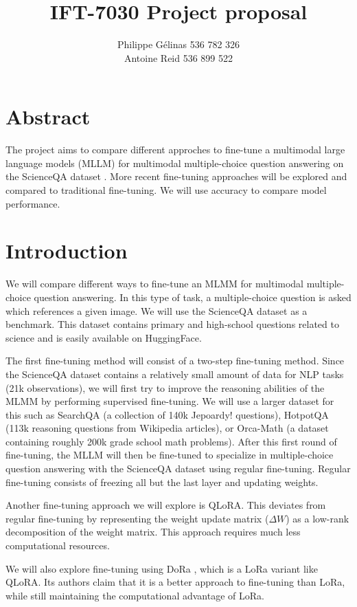 \documentclass[11pt]{article} %
\title{IFT-7030 Project proposal}
\author{Philippe Gélinas 536 782 326 \\ Antoine Reid 536 899 522}
\date{\vspace{-5ex}} %
\begin{document}
\maketitle

\section*{Abstract}
The project aims to compare different approches to fine-tune a multimodal large language models (MLLM) for multimodal multiple-choice question answering on the ScienceQA dataset \cite{ScienceQA}. More recent fine-tuning approaches will be explored and compared to traditional fine-tuning. We will use accuracy to compare model performance.

\section*{Introduction}
We will compare different ways to fine-tune an MLMM for multimodal multiple-choice question answering. In this type of task, a multiple-choice question is asked which references a given image. We will use the ScienceQA dataset as a benchmark. This dataset contains primary and high-school questions related to science and is easily available on HuggingFace.

The first fine-tuning method will consist of a two-step fine-tuning method. Since the ScienceQA dataset contains a relatively small amount of data for NLP tasks (21k observations), we will first try to improve the reasoning abilities of the MLMM by performing supervised fine-tuning. We will use a larger dataset for this such as SearchQA (a collection of 140k Jepoardy! questions), HotpotQA (113k reasoning questions from Wikipedia articles), or Orca-Math (a dataset containing roughly 200k grade school math problems). After this first round of fine-tuning, the MLLM will then be fine-tuned to specialize in multiple-choice question answering with the ScienceQA dataset using regular fine-tuning. Regular fine-tuning consists of freezing all but the last layer and updating weights.

Another fine-tuning approach we will explore is QLoRA. This deviates from regular fine-tuning by representing the weight update matrix ($\Delta W$) as a low-rank decomposition of the weight matrix. This approach requires much less computational resources.

We will also explore fine-tuning using DoRa \cite{dora}, which is a LoRa variant like QLoRA. Its authors claim that it is a better approach to fine-tuning than LoRa, while still maintaining the computational advantage of LoRa.
\end{document}
